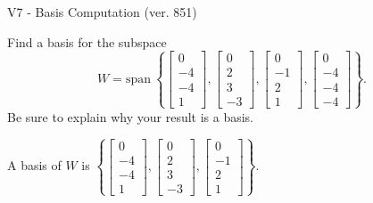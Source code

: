 \begin{exercise}
  \begin{exerciseTitle}V7 - Basis Computation (ver. 851)\end{exerciseTitle}
  \begin{exerciseStatement}
    Find a basis for the subspace 
\[W=\mathrm{span}\ \left\{\left[\begin{array}{r}
0 \\
-4 \\
-4 \\
1
\end{array}\right] , \left[\begin{array}{r}
0 \\
2 \\
3 \\
-3
\end{array}\right] , \left[\begin{array}{r}
0 \\
-1 \\
2 \\
1
\end{array}\right] , \left[\begin{array}{r}
0 \\
-4 \\
-4 \\
-4
\end{array}\right]\right\}.\]
 Be sure to explain why your result is a basis.


  \end{exerciseStatement}
  \begin{exerciseAnswer}
   A basis of \(W\) is  \(\left\{\left[\begin{array}{r}
0 \\
-4 \\
-4 \\
1
\end{array}\right] , \left[\begin{array}{r}
0 \\
2 \\
3 \\
-3
\end{array}\right] , \left[\begin{array}{r}
0 \\
-1 \\
2 \\
1
\end{array}\right]\right\}\).
  


  \end{exerciseAnswer}
\end{exercise}